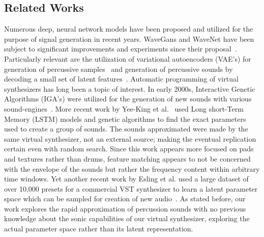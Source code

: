\documentclass[runningheads,a4paper]{llncs}
\begin{document}
\subsection{Related Works}
\label{related_works}
\begin{center}
\begin{table}[h]
\caption{Quick reference of recent related works}
\end{table}
\label{table:recent_works}
\end{center}
Numerous deep, neural network models have been proposed and utilized for the purpose of signal generation in recent years. WaveGans and WaveNet have been subject to significant improvements and experiments since their proposal~\cite{nsynth2017,yamamoto2020parallel,oord2017parallel}. Particularly relevant are the utilization of variational autoencoders (VAE's) for generation of percussive samples~\cite{aouameur2019neural} and generation of percussive sounds by decoding a small set of latent features~\cite{ramires2020neural}.
Automatic programming of virtual synthesizers has long been a topic of interest. In early 2000s, Interactive Genetic Algorithms (IGA's) were utilized for the generation of new sounds with various sound-engines~\cite{johnson1999exploring,dahlstedt2001creating}. More recent work by Yee-King et al.~\cite{yee2018automatic} used Long short-Term Memory (LSTM) models and genetic algorithms to find the exact parameters used to create a group of sounds. The sounds approximated were made by the same virtual synthesizer, not an external source; making the eventual replication certain even with random search. Since this work appears more focused on pads and textures rather than drums, feature matching appears to not be concerned with the envelope of the sounds but rather the frequency content within arbitrary time windows. Yet another recent work by Esling et al. used a large dataset of over 10,000 presets for a commercial VST synthesizer to learn a latent parameter space which can be sampled for creation of new audio~\cite{esling2019universal}. As stated before, our work explores the rapid approximation of percussion sounds with no previous knowledge about the sonic capabilities of our virtual synthesizer, exploring the actual parameter space rather than its latent representation.
\end{document}

